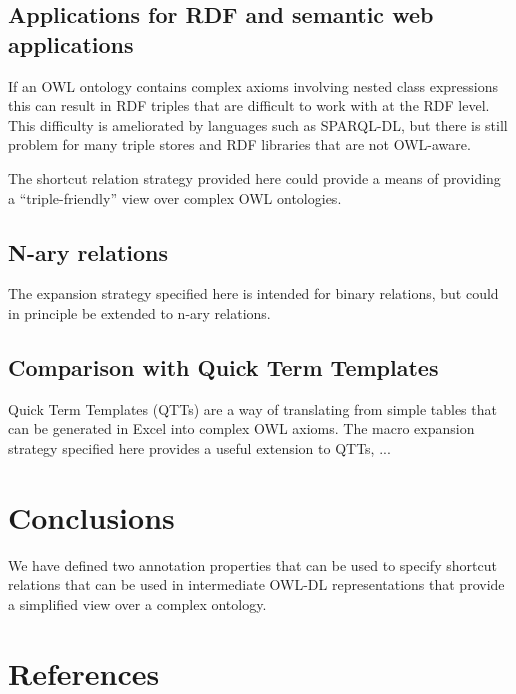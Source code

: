 \documentclass{llncs}
\begin{document}
\subsection{Applications for RDF and semantic web applications}

If an OWL ontology contains complex axioms involving nested class
expressions this can result in RDF triples that are difficult to work
with at the RDF level. This difficulty is ameliorated by languages
such as SPARQL-DL, but there is still problem for many triple stores
and RDF libraries that are not OWL-aware.

The shortcut relation strategy provided here could provide a means of
providing a ``triple-friendly'' view over complex OWL ontologies.

\subsection{N-ary relations}

The expansion strategy specified here is intended for binary
relations, but could in principle be extended to n-ary relations.

\subsection{Comparison with Quick Term Templates}

Quick Term Templates (QTTs)\cite{QTT2009} are a way of translating
from simple tables that can be generated in Excel into complex OWL
axioms. The macro expansion strategy specified here provides a useful
extension to QTTs, ...


\section{Conclusions}

We have defined two annotation properties that can be used to specify
shortcut relations that can be used in intermediate OWL-DL
representations that provide a simplified view over a complex
ontology. 

\section{References}



\end{document}

